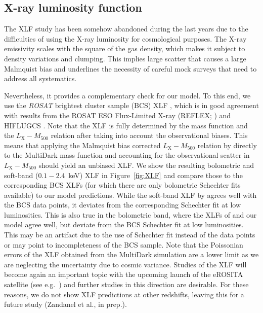 \documentclass[traditabstract]{aa}
\newcommand{\rmn}{\mathrm}
\begin{document}
\subsection{X-ray luminosity function}

The XLF study has been somehow abandoned during the last years due to the
difficulties of using the X-ray luminosity for cosmological purposes. The X-ray
emissivity scales with the square of the gas density, which makes it subject to
density variations and clumping. This implies large scatter that causes a large
Malmquist bias and underlines the necessity of careful mock surveys that need to
address all systematics.

Nevertheless, it provides a complementary check for our model. To this end, we
use the \emph{ROSAT} brightest cluster sample (BCS) XLF
\citep{1997ApJ...479L.101E}, which is in good agreement with results from the
ROSAT ESO Flux-Limited X-ray (REFLEX; \citealp{2002ApJ...566...93B}) and
HIFLUGCS \citep{2002ApJ...567..716R}.  Note that the XLF is fully determined by
the mass function and the $L_{\rmn{X}}-M_{500}$ relation after taking into
account the observational biases. This means that applying the Malmquist bias
corrected $L_{\rmn{X}}-M_{500}$ relation by \cite{2010MNRAS.406.1773M} directly
to the MultiDark mass function and accounting for the observational scatter in
$L_{\rmn{X}}-M_{500}$ should yield an unbiased XLF. We show the resulting
bolometric and soft-band ($0.1-2.4$~keV) XLF in Figure~\ref{fig:XLF} and compare
those to the corresponding BCS XLFs (for which there are only bolometric
Schechter fits available) to our model predictions.  While the soft-band XLF by
\cite{2010MNRAS.406.1773M} agrees well with the BCS data points, it deviates
from the corresponding Schechter fit at low luminosities. This is also true in
the bolometric band, where the XLFs of \cite{2010MNRAS.406.1773M} and our model
agree well, but deviate from the BCS Schechter fit at low luminosities. This may
be an artifact due to the use of Schechter fit instead of the data points or may
point to incompleteness of the BCS sample. Note that the Poissonian errors of
the XLF obtained from the MultiDark simulation are a lower limit as we are
neglecting the uncertainty due to cosmic variance.  Studies of the XLF will
become again an important topic with the upcoming launch of the eROSITA
satellite (see e.g.~\citealp{2011MSAIS..17..159C}) and further studies in this
direction are desirable. For these reasons, we do not show XLF predictions at
other redshifts, leaving this for a future study (Zandanel et al., in prep.).
\end{document}
